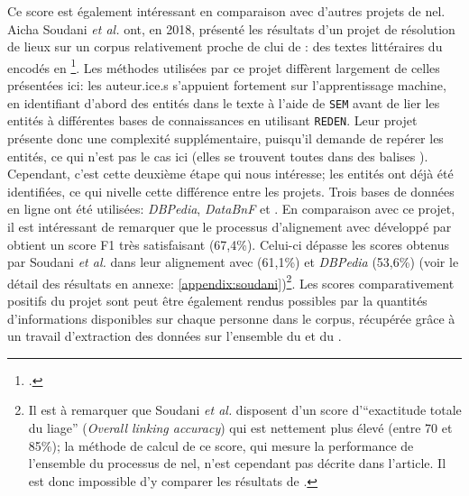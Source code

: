 Ce score est également intéressant en comparaison avec d'autres projets de \gls{nel}. Aicha Soudani \textit{et al.} ont, en 2018, présenté les résultats d'un projet de résolution de lieux sur un corpus relativement proche de clui de \mssktb{}: des textes littéraires du  encodés en \xmltei{}\footcite{soudani_adaptation_2018}. Les méthodes utilisées par ce projet diffèrent largement de celles présentées ici: les auteur.ice.s s'appuient fortement sur l'apprentissage machine, en identifiant d'abord des entités dans le texte à l'aide de \texttt{SEM} avant de lier les entités à différentes bases de connaissances en utilisant \texttt{REDEN}. Leur projet présente donc une complexité supplémentaire, puisqu'il demande de repérer les entités, ce qui n'est pas le cas ici (elles se trouvent toutes dans des balises \tname{}). Cependant, c'est cette deuxième étape qui nous intéresse; les entités ont déjà été identifiées, ce qui nivelle cette différence entre les projets. Trois bases de données en ligne ont été utilisées: \textit{DBPedia}, \textit{DataBnF} et \wkd{}. En comparaison avec ce projet, il est intéressant de remarquer que le processus d'alignement avec \wkd{} développé par \mssktb{} obtient un \gls{score F1} très satisfaisant (67,4\%). Celui-ci dépasse les scores obtenus par Soudani \textit{et al.} dans leur alignement avec \wkd{} (61,1\%) et \textit{DBPedia} (53,6\%) (voir le détail des résultats en annexe: \ref{appendix:soudani})\footnote{
	Il est à remarquer que Soudani \textit{et al.} disposent d'un score d'\enquote{exactitude totale du liage} (\textit{Overall linking accuracy}) qui est nettement plus élevé (entre 70 et 85\%); la méthode de calcul de ce score, qui mesure la performance de l'ensemble du processus de \gls{nel}, n'est cependant pas décrite dans l'article. Il est donc impossible d'y comparer les résultats de \mssktb{}.
}. Les scores comparativement positifs du projet \mssktb{} sont peut être également rendus possibles par la quantités d'informations disponibles sur chaque personne dans le corpus, récupérée grâce à un travail d'extraction des données sur l'ensemble du \ttrait{} et du \tname{}.

